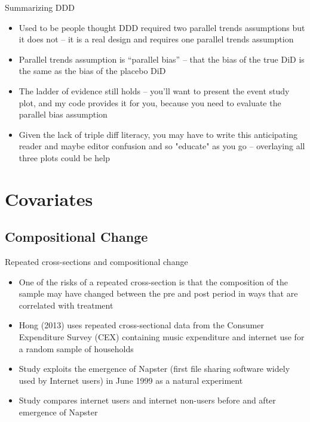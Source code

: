 \documentclass{beamer}
\begin{document}
\begin{frame}{Summarizing DDD}

\begin{itemize}
\item Used to be people thought DDD required two parallel trends assumptions but it does not -- it is a real design and requires one parallel trends assumption
\item Parallel trends assumption is ``parallel bias'' -- that the bias of the true DiD is the same as the bias of the placebo DiD
\item The ladder of evidence still holds -- you'll want to present the event study plot, and my code provides it for you, because you need to evaluate the parallel bias assumption
\item Given the lack of triple diff literacy, you may have to write this anticipating reader and maybe editor confusion and so "educate" as you go -- overlaying all three plots could be help

\end{itemize}

\end{frame}




\section{Covariates}

\subsection{Compositional Change}

\begin{frame}{Repeated cross-sections and compositional change}

	\begin{itemize}
	\item One of the risks of a repeated cross-section is that the composition of the sample may have changed between the pre and post period in ways that are correlated with treatment
	\item Hong (2013) uses repeated cross-sectional data from the Consumer Expenditure Survey (CEX) containing music expenditure and internet use for a random sample of households
	\item Study exploits the emergence of Napster (first file sharing software widely used by Internet users) in June 1999 as a natural experiment
	\item Study compares internet users and internet non-users before and after emergence of Napster
	\end{itemize}

\end{frame}
\end{document}
